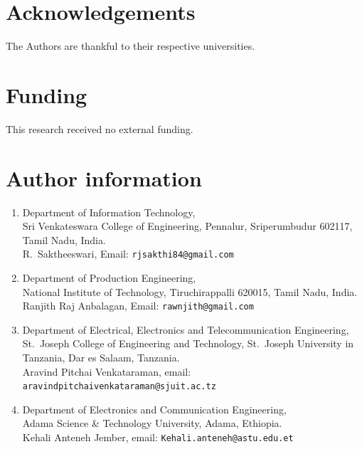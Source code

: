 \documentclass[11pt,a4paper]{article}
\begin{document}
\section*{Acknowledgements}
The Authors are thankful to their respective universities.

\section*{Funding}
This research received no external funding.

\section*{Author information}

\begin{enumerate}
\item Department of Information Technology,\\
Sri Venkateswara College of Engineering, Pennalur, Sriperumbudur 602117, Tamil Nadu, India.\\
R.~Saktheeswari, Email: \texttt{rjsakthi84@gmail.com}

\item Department of Production Engineering,\\
National Institute of Technology, Tiruchirappalli 620015, Tamil Nadu, India.\\
Ranjith Raj Anbalagan, Email: \texttt{rawnjith@gmail.com}

\item Department of Electrical, Electronics and Telecommunication Engineering,\\
St.\ Joseph College of Engineering and Technology, St.\ Joseph University in Tanzania, Dar es Salaam, Tanzania.\\
Aravind Pitchai Venkataraman, email: \texttt{aravindpitchaivenkataraman@sjuit.ac.tz}

\item Department of Electronics and Communication Engineering,\\
Adama Science \& Technology University, Adama, Ethiopia.\\
Kehali Anteneh Jember, email: \texttt{Kehali.anteneh@astu.edu.et}
\end{enumerate}
\end{document}
